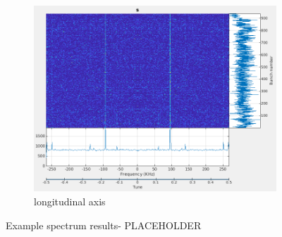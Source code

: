 \documentclass{report}
\begin{document}
\begin{figure}[hbt]
    \begin{subfigure}[b]{0.45\textwidth}
        \includegraphics[width=\textwidth]{vlr_spectrum_s.png}
        \caption{longitudinal axis}
        \label{fig:spectrum_example_z}
    \end{subfigure}
    \caption{Example spectrum results- PLACEHOLDER}
    \label{fig:spectrum_example}
\end{figure}
\clearpage
\end{document}
